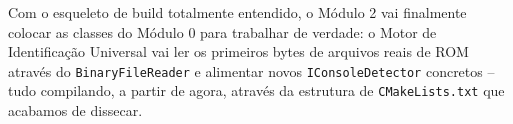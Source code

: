 \begin{CaixaResumo}
Com o esqueleto de build totalmente entendido, o Módulo 2 vai finalmente colocar as classes do Módulo 0 para trabalhar de verdade: o Motor de Identificação Universal vai ler os primeiros bytes de arquivos reais de ROM através do \texttt{BinaryFileReader} e alimentar novos \texttt{IConsoleDetector} concretos -- tudo compilando, a partir de agora, através da estrutura de \texttt{CMakeLists.txt} que acabamos de dissecar.
\end{CaixaResumo}
